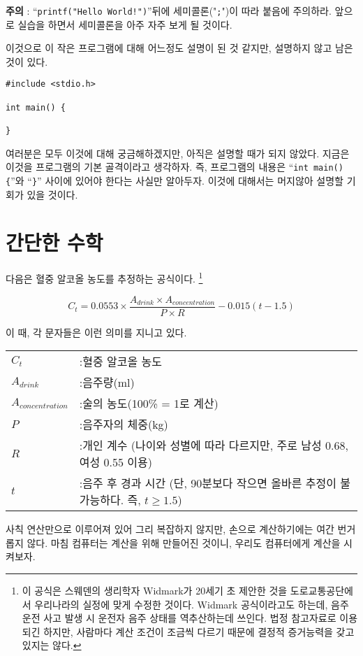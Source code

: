 \documentclass[../main.tex]{subfiles}
\begin{document}
\textbf{주의} : ``\texttt{printf("Hello World!")}''뒤에
세미콜론("\texttt{;}")이 따라 붙음에 주의하라. 앞으로 실습을 하면서
세미콜론을 아주 자주 보게 될 것이다.

이것으로 이 작은 프로그램에 대해 어느정도 설명이 된 것 같지만, 설명하지
않고 남은 것이 있다.

\begin{verbatim}
#include <stdio.h>

int main() {

}
\end{verbatim}

여러분은 모두 이것에 대해 궁금해하겠지만, 아직은 설명할 때가 되지
않았다. 지금은 이것을 프로그램의 기본 골격이라고 생각하자. 즉, 프로그램의
내용은 ``\texttt{int main() \{}''와 ``\texttt{\}}'' 사이에 있어야
한다는 사실만 알아두자. 이것에 대해서는 머지않아 설명할 기회가 있을
것이다.

\section{간단한 수학}
다음은 혈중 알코올 농도를 추정하는 공식이다. \footnote{이 공식은
  스웨덴의 생리학자 Widmark가 20세기 초 제안한 것을 도로교통공단에서
  우리나라의 실정에 맞게 수정한 것이다. Widmark 공식이라고도 하는데,
  음주 운전 사고 발생 시 운전자 음주 상태를 역추산하는데 쓰인다. 법정
  참고자료로 이용되긴 하지만, 사람마다 계산 조건이 조금씩 다르기 때문에
  결정적 증거능력을 갖고 있지는 않다.}

$$ C_{t} = 0.0553 \times \frac{A_{drink} \times A_{concentration}}{ P \times R} - 0.015(t - 1.5) $$

이 때, 각 문자들은 이런 의미를 지니고 있다.

\begin{tabular}{l l}
  $C_{t}$ & :혈중 알코올 농도 \\
  $A_{drink}$ & :음주량(ml) \\
  $A_{concentration}$ & :술의 농도(100\% = 1로 계산)\\
  $P$ & :음주자의 체중(kg) \\
  $R$ & :개인 계수
        (나이와 성별에 따라 다르지만, 주로 남성 0.68, 여성 0.55 이용) \\
  $t$ & :음주 후 경과 시간
        (단, 90분보다 작으면 올바른 추정이 불가능하다. 즉, $t \geq 1.5$)
\end{tabular}

사칙 연산만으로 이루어져 있어 그리 복잡하지 않지만, 손으로 계산하기에는
여간 번거롭지 않다. 마침 컴퓨터는 계산을 위해 만들어진 것이니, 우리도
컴퓨터에게 계산을 시켜보자.
\end{document}

